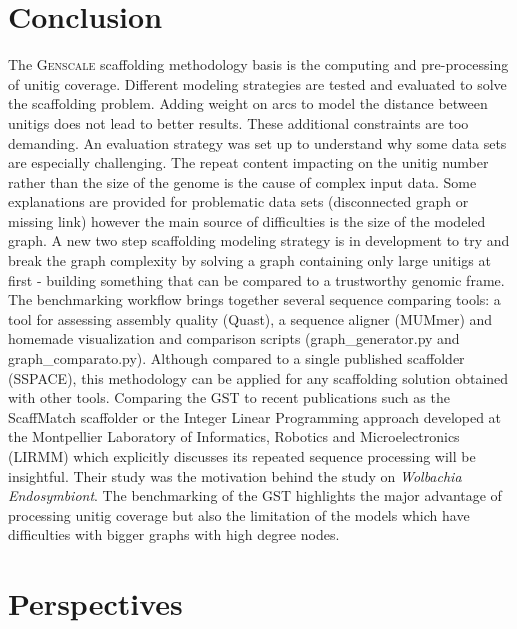 \documentclass[12pt]{article}
\begin{document}
\section{Conclusion} \label{sec:conc}
The \textsc{Genscale} scaffolding methodology basis is the computing and pre-processing of unitig coverage. Different modeling strategies are tested and evaluated to solve the scaffolding problem. Adding weight on arcs to model the distance between unitigs does not lead to better results. These additional constraints are too demanding. An evaluation strategy was set up to understand why some data sets are especially challenging. The repeat content impacting on the unitig number rather than the size of the genome is the cause of complex input data. Some explanations are provided for problematic data sets (disconnected graph or missing link) however the main source of difficulties is the size of the modeled graph. A new two step scaffolding modeling strategy is in development to try and break the graph complexity by solving a graph containing only large unitigs at first - building something that can be compared to a trustworthy genomic frame. The benchmarking workflow brings together several sequence comparing tools: a tool for assessing assembly quality (Quast), a sequence aligner (MUMmer) and homemade visualization and comparison scripts (graph\_generator.py and graph\_comparato.py). Although compared to a single published scaffolder (SSPACE), this methodology can be applied for any scaffolding solution obtained with other tools. Comparing the GST to recent publications such as the ScaffMatch scaffolder or the Integer Linear Programming approach developed at the Montpellier Laboratory of Informatics, Robotics and Microelectronics (LIRMM) which explicitly discusses its repeated sequence processing will be insightful. Their study was the motivation behind the study on \textit{Wolbachia Endosymbiont}. The benchmarking of the GST highlights the major advantage of processing unitig coverage but also the limitation of the models which have difficulties with bigger graphs with high degree nodes. 

\section{Perspectives}\label{sec:persp}
\clearpage

\end{document}
